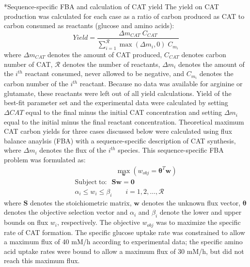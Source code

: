 \documentclass[12pt]{article}
\makeatletter
\renewcommand\subsection{\@startsection
	{subsection}{2}{0mm}
	{-0.05in}
	{-0.5\baselineskip}
	{\normalfont\normalsize\bfseries}}
\makeatother
\begin{document}
\subsection*{Sequence-specific FBA and calculation of CAT yield}
The yield on CAT production was calculated for each case as a ratio of carbon produced as CAT to carbon consumed as reactants (glucose and amino acids):
\begin{equation}\label{eqn:yield-definition}
	Yield=\frac{\Delta m_{CAT}\;C_{CAT}}{\sum_{i=1}^{\mathcal{R}}\max(\Delta m_{i},0)\;C_{m_i}}
\end{equation}
where $\Delta m_{CAT}$ denotes the amount of CAT produced, $C_{CAT}$ denotes carbon number of CAT, $\mathcal{R}$ denotes the number of reactants, $\Delta m_{i}$ denotes the amount of the $i^{th}$ reactant consumed, never allowed to be negative, and $C_{m_i}$ denotes the carbon number of the $i^{th}$ reactant.
Because no data was available for arginine or glutamate, these reactants were left out of all yield calculations.
Yield of the best-fit parameter set and the experimental data were calculated by setting $\Delta CAT$ equal to the final minus the initial CAT concentration and setting $\Delta m_{i}$ equal to the initial minus the final reactant concentration.
Theoretical maximum CAT carbon yields for three cases discussed below were calculated using flux balance anaylsis (FBA) with a sequence-specific description of CAT synthesis, where $\Delta m_{i}$ denotes the flux of the $i^{th}$ species.
This sequence-specific FBA \citep{Allen:2003aa} problem was formulated as:
\begin{equation}
 \begin{multlined}
	\qquad \qquad \qquad \max_{\boldsymbol{w}}{} \! \left( w_{obj} = \mathbf{\boldsymbol{\theta}}^T \boldsymbol{w} \right) \\
	\mathrm{Subject \; to:}
	 \; \; \mathbf{S}\mathbf{w}=\mathbf{0} \\
\alpha_i \leq w_i \leq \beta_i  \qquad i=1,2,\hdots,\mathcal{R}
 \end{multlined}
\end{equation}
where $\mathbf{S}$ denotes the stoichiometric matrix, $\mathbf{w}$ denotes the unknown flux vector, $\boldsymbol{\theta}$ denotes the objective selection vector
and $\alpha_i$ and $\beta_i$ denote the lower and upper bounds on flux $w_{i}$, respectively.
The objective $w_{obj}$ was to maximize the specific rate of CAT formation.
The specific glucose uptake rate was constrained to allow a maximum flux of 40 mM/h according to experimental data; the specific amino acid uptake rates were bound to allow a maximum flux of 30 mM/h, but did not reach this maximum flux.
\end{document}
